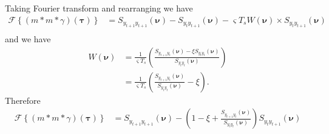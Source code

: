 \documentclass[]{article}
\begin{document}
Taking Fourier transform and rearranging we have
\begin{align}
 \mathcal F\left\lbrace (m\ast m \ast \gamma)(\boldsymbol\tau)\right\rbrace&= S_{y_{t+1}y_{t+1}}(\boldsymbol{\nu})-S_{y_{t}y_{t+1}}(\boldsymbol{\nu})-\varsigma T_s W(\boldsymbol{\nu}) \times S_{y_ty_{t+1}}(\boldsymbol{\nu}) \nonumber \\
\end{align}
and we have
\begin{align}
 W(\boldsymbol{\nu}) &=\frac{1}{\varsigma T_s}\left(\frac{S_{y_{t+1}y_t}(\boldsymbol{\nu}) -\xi S_{y_ty_t}(\boldsymbol{\nu})}{S_{y_ty_t}(\boldsymbol{\nu})}\right) \nonumber \\
&=\frac{1}{\varsigma T_s}\left(\frac{S_{y_{t+1}y_t}(\boldsymbol{\nu})}{S_{y_ty_t}(\boldsymbol{\nu})}-\xi\right).
\end{align}
Therefore
\begin{align}
 \mathcal F\left\lbrace (m\ast m \ast \gamma)(\boldsymbol\tau)\right\rbrace&= S_{y_{t+1}y_{t+1}}(\boldsymbol{\nu})-\left(1-\xi+\frac{S_{y_{t+1}y_t}(\boldsymbol{\nu})}{S_{y_ty_t}(\boldsymbol{\nu})}\right)S_{y_{t}y_{t+1}}(\boldsymbol{\nu})
\end{align}
\end{document}
